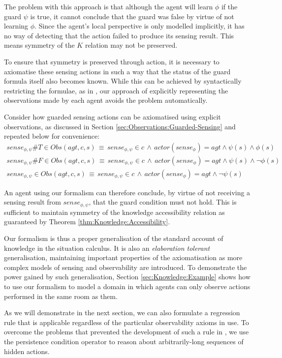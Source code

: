 The problem with this approach is that although the agent will learn
$\phi$ if the guard $\psi$ is true, it cannot conclude that the
guard was false by virtue of not learning $\phi$. Since the agent's
local perspective is only modelled implicitly, it has no way of detecting
that the action failed to produce its sensing result. This means symmetry
of the $K$ relation may not be preserved.

To ensure that symmetry is preserved through action, it is necessary
to axiomatise these sensing actions in such a way that the status
of the guard formula itself also becomes known. While this can be
achieved by syntactically restricting the formulae, as in \citep{Petrick06thesis},
our approach of explicitly representing the observations made by each
agent avoids the problem automatically.

Consider how guarded sensing actions can be axiomatised using explicit
observations, as discussed in Section \ref{sec:Observations:Guarded-Sensing}
and repeated below for convenience:\begin{gather*}
sense_{\phi,\psi}\#T\in Obs(agt,c,s)\,\equiv\, sense_{\phi,\psi}\in c\,\wedge\, actor(sense_{\phi})=agt\wedge\psi(s)\wedge\phi(s)\\
sense_{\phi,\psi}\#F\in Obs(agt,c,s)\,\equiv\, sense_{\phi,\psi}\in c\,\wedge\, actor(sense_{\phi})=agt\wedge\psi(s)\wedge\neg\phi(s)\\
sense_{\phi,\psi}\in Obs(agt,c,s)\,\equiv\, sense_{\phi,\psi}\in c\,\wedge\, actor(sense_{\phi})=agt\wedge\neg\psi(s)\end{gather*}


An agent using our formalism can therefore conclude, by virtue of
not receiving a sensing result from $sense_{\phi,\psi}$, that the
guard condition must not hold. This is sufficient to maintain symmetry
of the knowledge accessibility relation as guaranteed by Theorem \ref{thm:Knowledge:Accessibility}.

Our formalism is thus a proper generalisation of the standard account
of knowledge in the situation calculus. It is also an \emph{elaboration
tolerant} generalisation, maintaining important properties of the
axiomatisation as more complex models of sensing and observability
are introduced. To demonstrate the power gained by such generalisation,
Section \ref{sec:Knowledge:Example} shows how to use our formalism
to model a domain in which agents can only observe actions performed
in the same room as them.

As we will demonstrate in the next section, we can also formulate
a regression rule that is applicable regardless of the particular
observability axioms in use. To overcome the problems that prevented
the development of such a rule in \citep{Lesperance99sitcalc_approach},
we use the persistence condition operator to reason about arbitrarily-long
sequences of hidden actions.


